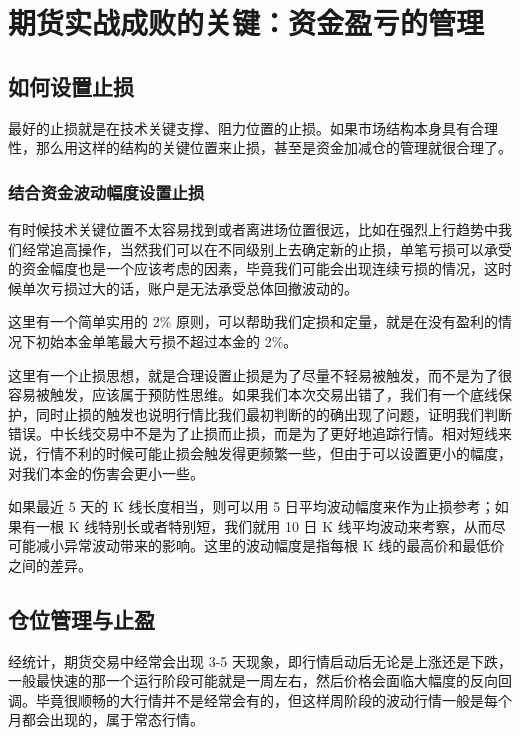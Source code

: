 \chapter{期货实战成败的关键：资金盈亏的管理}
\section{如何设置止损}
最好的止损就是在技术关键支撑、阻力位置的止损。如果市场结构本身具有合理性，那么用这样的结构的关键位置来止损，甚至是资金加减仓的管理就很合理了。
\subsection{结合资金波动幅度设置止损}
有时候技术关键位置不太容易找到或者离进场位置很远，比如在强烈上行趋势中我们经常追高操作，当然我们可以在不同级别上去确定新的止损，单笔亏损可以承受的资金幅度也是一个应该考虑的因素，毕竟我们可能会出现连续亏损的情况，这时候单次亏损过大的话，账户是无法承受总体回撤波动的。

这里有一个简单实用的 2\% 原则，可以帮助我们定损和定量，就是在没有盈利的情况下初始本金单笔最大亏损不超过本金的 2\%。

这里有一个止损思想，就是合理设置止损是为了尽量不轻易被触发，而不是为了很容易被触发，应该属于预防性思维。如果我们本次交易出错了，我们有一个底线保护，同时止损的触发也说明行情比我们最初判断的的确出现了问题，证明我们判断错误。中长线交易中不是为了止损而止损，而是为了更好地追踪行情。相对短线来说，行情不利的时候可能止损会触发得更频繁一些，但由于可以设置更小的幅度，对我们本金的伤害会更小一些。

如果最近 5 天的 K 线长度相当，则可以用 5 日平均波动幅度来作为止损参考；如果有一根 K 线特别长或者特别短，我们就用 10 日 K 线平均波动来考察，从而尽可能减小异常波动带来的影响。这里的波动幅度是指每根 K 线的最高价和最低价之间的差异。
\section{仓位管理与止盈}
经统计，期货交易中经常会出现 3-5 天现象，即行情启动后无论是上涨还是下跌，一般最快速的那一个运行阶段可能就是一周左右，然后价格会面临大幅度的反向回调。毕竟很顺畅的大行情并不是经常会有的，但这样周阶段的波动行情一般是每个月都会出现的，属于常态行情。

